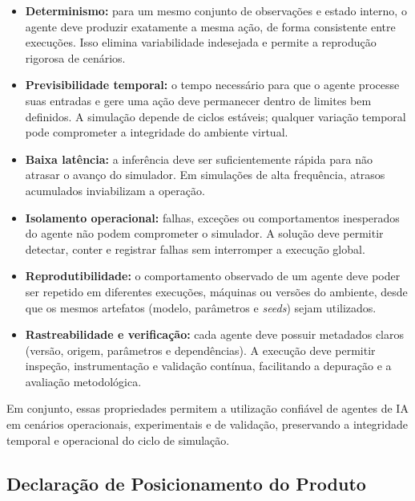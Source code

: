 \begin{itemize}

    \item \textbf{Determinismo:} para um mesmo conjunto de observações e estado interno, o agente deve produzir exatamente a mesma ação, de forma consistente entre execuções. Isso elimina variabilidade indesejada e permite a reprodução rigorosa de cenários.

    \item \textbf{Previsibilidade temporal:} o tempo necessário para que o agente processe suas entradas e gere uma ação deve permanecer dentro de limites bem definidos. A simulação depende de ciclos estáveis; qualquer variação temporal pode comprometer a integridade do ambiente virtual.

    \item \textbf{Baixa latência:} a inferência deve ser suficientemente rápida para não atrasar o avanço do simulador. Em simulações de alta frequência, atrasos acumulados inviabilizam a operação.

    \item \textbf{Isolamento operacional:} falhas, exceções ou comportamentos inesperados do agente não podem comprometer o simulador. A solução deve permitir detectar, conter e registrar falhas sem interromper a execução global.

    \item \textbf{Reprodutibilidade:} o comportamento observado de um agente deve poder ser repetido em diferentes execuções, máquinas ou versões do ambiente, desde que os mesmos artefatos (modelo, parâmetros e \emph{seeds}) sejam utilizados.

    \item \textbf{Rastreabilidade e verificação:} cada agente deve possuir metadados claros (versão, origem, parâmetros e dependências). A execução deve permitir inspeção, instrumentação e validação contínua, facilitando a depuração e a avaliação metodológica.

\end{itemize}

Em conjunto, essas propriedades permitem a utilização confiável de agentes de IA em cenários operacionais, experimentais e de validação, preservando a integridade temporal e operacional do ciclo de simulação.

\subsection{Declaração de Posicionamento do Produto}


